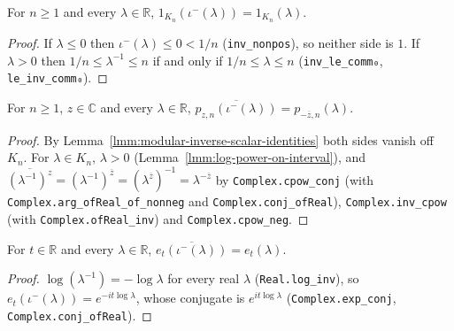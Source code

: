\begin{lemma}
    \label{lmm:modular-inverse-scalar-identities}
    \leanok
    For $n \ge 1$ and every $\lambda \in \mathbb{R}$, $1_{K_n}(\iota^-(\lambda)) = 1_{K_n}(\lambda)$.
\end{lemma}
\begin{proof}
    \leanok
    If $\lambda \le 0$ then $\iota^-(\lambda) \le 0 < 1/n$ (\texttt{inv\_nonpos}), so neither side is $1$. If $\lambda > 0$ then $1/n \le \lambda^{-1} \le n$ if and only if $1/n \le \lambda \le n$ (\texttt{inv\_le\_comm₀}, \texttt{le\_inv\_comm₀}).
\end{proof}

\begin{lemma}
    \label{lmm:modular-inverse-power-function}
    \leanok
    For $n \ge 1$, $z \in \mathbb{C}$ and every $\lambda \in \mathbb{R}$, $\overline{p_{z,n}(\iota^-(\lambda))} = p_{-\overline{z},n}(\lambda)$.
\end{lemma}
\begin{proof}
    \leanok
    By Lemma~\ref{lmm:modular-inverse-scalar-identities} both sides vanish off $K_n$. For $\lambda \in K_n$, $\lambda > 0$ (Lemma~\ref{lmm:log-power-on-interval}), and $\overline{(\lambda^{-1})^z} = (\lambda^{-1})^{\overline{z}} = (\lambda^{\overline{z}})^{-1} = \lambda^{-\overline{z}}$ by \texttt{Complex.cpow\_conj} (with \texttt{Complex.arg\_ofReal\_of\_nonneg} and \texttt{Complex.conj\_ofReal}), \texttt{Complex.inv\_cpow} (with \texttt{Complex.ofReal\_inv}) and \texttt{Complex.cpow\_neg}.
\end{proof}

\begin{lemma}
    \label{lmm:modular-inverse-unitary-function}
    \leanok
    For $t \in \mathbb{R}$ and every $\lambda \in \mathbb{R}$, $\overline{e_t(\iota^-(\lambda))} = e_t(\lambda)$.
\end{lemma}
\begin{proof}
    \leanok
    $\log(\lambda^{-1}) = -\log\lambda$ for every real $\lambda$ (\texttt{Real.log\_inv}), so $e_t(\iota^-(\lambda)) = e^{-it\log\lambda}$, whose conjugate is $e^{it\log\lambda}$ (\texttt{Complex.exp\_conj}, \texttt{Complex.conj\_ofReal}).
\end{proof}

